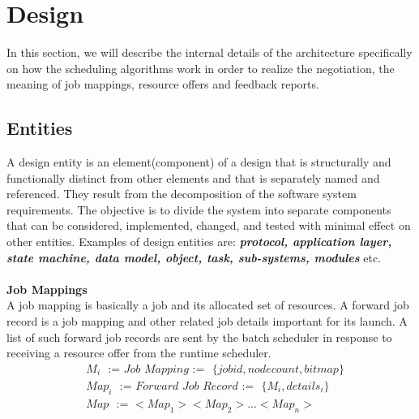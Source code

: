 \chapter{Design}
In this section, we will describe the internal details of the architecture specifically on how the scheduling algorithms work in order to realize the negotiation, the meaning of job mappings, resource offers and feedback reports. 
\label{chapter:ischeduler}
\section{Entities}
A design entity is an element(component) of a design that is structurally and functionally distinct from other elements and that is separately named and referenced. They result from the decomposition of the software system requirements. The objective is to divide the system into separate components that can be considered, implemented, changed, and tested with minimal effect on other entities. Examples of design entities are: \textbf{\textit{protocol, application layer, state machine, data model, object, task, sub-systems, modules}} etc.\\ \\
\textbf{Job Mappings}\\
A job mapping is basically a job and its allocated set of resources. A forward job record is a job mapping and other related job details important for its launch. A list of such forward job records are sent by the batch scheduler in response to receiving a resource offer from the runtime scheduler.\\
\begin{equation*}
\begin{aligned}
&M_{i}\ \ \ \textit{:=\ \ \ Job Mapping\ \ \ :=}\ \ \ \{jobid,node count,bitmap\}\\
&Map_{i}\ \ \ \textit{:=\ \ \ Forward Job Record\ \ \ :=}\ \ \ \{M_{i},details_{i}\}\\
&Map\ \ \ \textit{:=\ \ \ {$<Map_{1}><Map_{2}>...<Map_{n}>$}}
\end{aligned}
\end{equation*}
